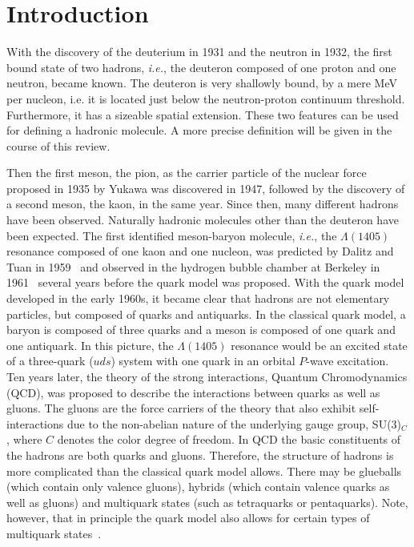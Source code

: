 
\section{Introduction}
\label{sec:1}


With the discovery of the deuterium in 1931 and the neutron in 1932, the first
bound state of two hadrons, {\sl i.e.}, the deuteron composed of one proton and
one neutron, became known.  The deuteron is very shallowly bound, by a mere MeV
per nucleon, i.e. it is located just below the neutron-proton continuum
threshold. Furthermore, it has a sizeable spatial extension. These two features
can be used for defining a hadronic molecule. A more precise definition will be
given in the course of this review.

Then the first meson, the pion, as the carrier particle of the nuclear force
proposed in 1935 by  Yukawa was discovered in 1947, followed by the discovery of
a second meson, the kaon, in the same year.
Since then, many different hadrons have been observed. Naturally hadronic
molecules other than the deuteron have been expected.  The first identified
meson-baryon molecule, {\sl i.e.}, the $\Lambda(1405)$ resonance composed of one
kaon and one nucleon, was predicted by Dalitz and Tuan in
1959~\cite{Dalitz:1959dn} and observed in the hydrogen bubble chamber at
Berkeley in 1961~\cite{Alston:1961zzd} several years before the  quark model was
proposed.
With the quark model developed in the early 1960s, it became clear that  hadrons
are not elementary particles, but composed of quarks and antiquarks. In the
classical quark model, a baryon is composed of three quarks and a meson is
composed of one quark and one antiquark.
In this picture, the $\Lambda(1405)$ resonance would be an excited state of a
three-quark ($uds$) system with one quark in an orbital $P$-wave excitation. Ten
years later, the theory of the strong interactions, Quantum Chromodynamics
(QCD), was proposed to describe the interactions between quarks as well as
gluons. The gluons  are the force carriers of the theory that also exhibit
self-interactions due to the non-abelian nature of the underlying gauge group,
SU(3)$_C$, where $C$ denotes the color degree of freedom.
In QCD the basic constituents of the hadrons are both quarks and gluons.
Therefore, the structure of hadrons is more complicated than the classical quark
model allows. There may be glueballs (which contain only valence gluons),
hybrids (which contain valence quarks as well as gluons) and multiquark states
(such as tetraquarks or pentaquarks). Note, however, that in principle the quark
model also allows for certain types of multiquark states~\cite{GellMann:1964nj}.

